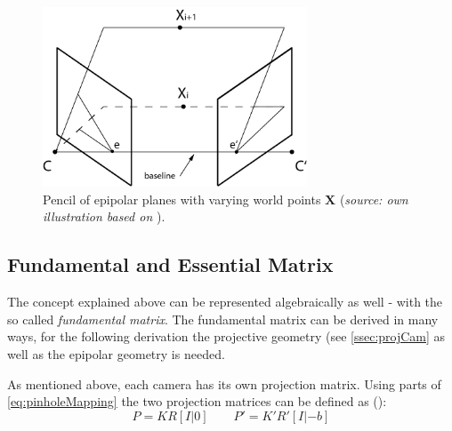 \begin{figure}[htbp]
		\centering
		\includegraphics[width=0.7\textwidth]{figures/EpipolarGeometry_Planes}
		\caption[Pencil of epipolar planes with varying world points X]{Pencil of epipolar planes with varying world points $\mathbf{X}$ (\textit{source: own illustration based on} \cite[p.240]{Hartley.2011}).}
		\label{fig:EpiPlanes}
\end{figure} 

\subsection{Fundamental and Essential Matrix}
The concept explained above can be represented algebraically as well - with the so called \textit{fundamental matrix}. The fundamental matrix can be derived in many ways, for the following derivation the projective geometry (see \autoref{ssec:projCam} as well as the epipolar geometry is needed. 


As mentioned above, each camera has its own projection matrix. Using parts of \autoref{eq:pinholeMapping} the two projection matrices can be defined as (\cite[p.309]{Luhmann.2014}):
\begin{equation}
 P=KR[I | 0]
\qquad
 P'=K'R'[I | -b]
\end{equation}

